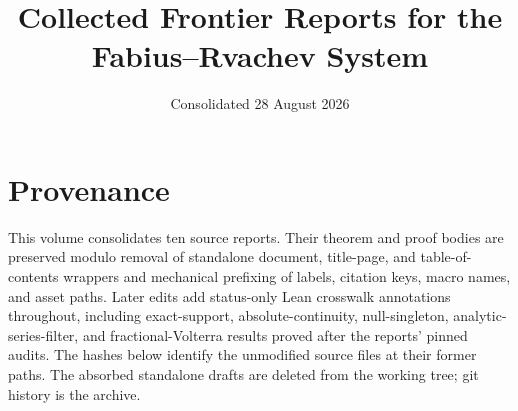 \documentclass[11pt]{article}
\title{\bfseries Collected Frontier Reports for the Fabius--Rvachev System}
\author{}
\date{Consolidated 28 August 2026}
\numberwithin{equation}{section}
\theoremstyle{definition}
\theoremstyle{remark}
\begin{document}
\maketitle
\tableofcontents
\clearpage
\section*{Provenance}
This volume consolidates ten source reports.  Their theorem and proof bodies are preserved
modulo removal of standalone document, title-page, and table-of-contents wrappers and
mechanical prefixing of labels, citation keys, macro names, and asset paths.  Later edits add
status-only Lean crosswalk annotations throughout, including exact-support,
absolute-continuity, null-singleton, analytic-series-filter, and fractional-Volterra results
proved after the reports' pinned audits.
The hashes below identify the unmodified source files at their former paths.  The absorbed
standalone drafts are deleted from the working tree; git history is the archive.
\end{document}
